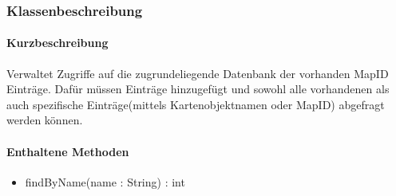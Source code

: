 \subsubsection*{Klassenbeschreibung}%
\paragraph*{Kurzbeschreibung}
Verwaltet Zugriffe auf die zugrundeliegende Datenbank der vorhanden MapID Einträge.
Dafür müssen Einträge hinzugefügt und sowohl alle vorhandenen als auch spezifische Einträge(mittels Kartenobjektnamen oder MapID) 
abgefragt werden können.
\paragraph*{Enthaltene Methoden}
\begin{itemize}
    \item findByName(name : String) : int
\end{itemize}
